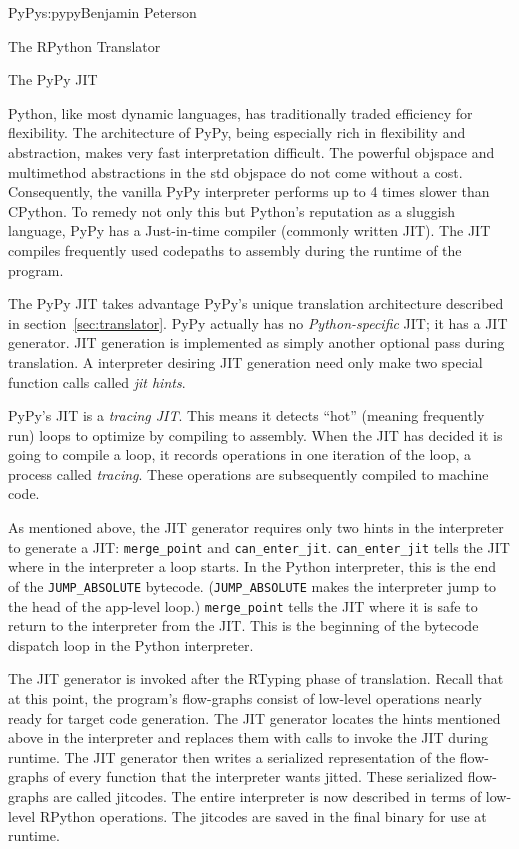 \begin{aosachapter}{PyPy}{s:pypy}{Benjamin Peterson}
\begin{aosasect1}{The RPython Translator}
\end{aosasect1}

\begin{aosasect1}{The PyPy JIT}
\label{sec:jit}

Python, like most dynamic languages, has traditionally traded efficiency for
flexibility. The architecture of PyPy, being especially rich in flexibility and
abstraction, makes very fast interpretation difficult. The powerful objspace and
multimethod abstractions in the std objspace do not come without a
cost. Consequently, the vanilla PyPy interpreter performs up to 4 times slower
than CPython. To remedy not only this but Python's reputation as a sluggish
language, PyPy has a Just-in-time compiler (commonly written JIT). The JIT
compiles frequently used codepaths to assembly during the runtime of the
program.

The PyPy JIT takes advantage PyPy's unique translation architecture described in
section~\ref{sec:translator}. PyPy actually has no \emph{Python-specific} JIT;
it has a JIT generator. JIT generation is implemented as simply another optional
pass during translation. A interpreter desiring JIT generation need only make
two special function calls called \emph{jit hints}.

PyPy's JIT is a \emph{tracing JIT}. This means it detects ``hot'' (meaning
frequently run) loops to optimize by compiling to assembly. When the JIT has
decided it is going to compile a loop, it records operations in one iteration of
the loop, a process called \emph{tracing}. These operations are subsequently
compiled to machine code.

As mentioned above, the JIT generator requires only two hints in the interpreter
to generate a JIT: \verb+merge_point+ and
\verb+can_enter_jit+. \verb+can_enter_jit+ tells the JIT where in the
interpreter a loop starts. In the Python interpreter, this is the end of the
\verb+JUMP_ABSOLUTE+ bytecode. (\verb+JUMP_ABSOLUTE+ makes the interpreter jump
to the head of the app-level loop.) \verb+merge_point+ tells the JIT where it is
safe to return to the interpreter from the JIT. This is the beginning of the
bytecode dispatch loop in the Python interpreter.

The JIT generator is invoked after the RTyping phase of translation. Recall that
at this point, the program's flow-graphs consist of low-level operations nearly
ready for target code generation. The JIT generator locates the hints mentioned
above in the interpreter and replaces them with calls to invoke the JIT during
runtime. The JIT generator then writes a serialized representation of the
flow-graphs of every function that the interpreter wants jitted. These
serialized flow-graphs are called jitcodes. The entire interpreter is now
described in terms of low-level RPython operations. The jitcodes are saved in
the final binary for use at runtime.


\end{aosasect1}
\end{aosachapter}
